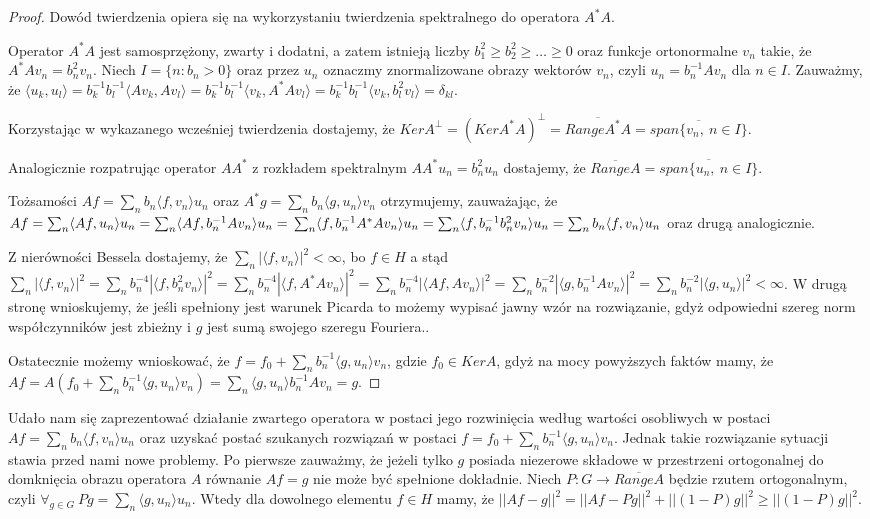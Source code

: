 \documentclass{article}
\begin{document}
\begin{proof}
Dowód twierdzenia opiera się na wykorzystaniu twierdzenia spektralnego do operatora $A^*A$.

Operator $A^*A$ jest samosprzężony, zwarty i dodatni, a zatem istnieją liczby $b_1^2\geq b_2^2\geq\dots\geq 0$ oraz funkcje ortonormalne $v_n$ takie, że $A^*Av_n=b_n^2v_n$. Niech $I=\{n\colon b_n>0\}$ oraz przez $u_n$ oznaczmy znormalizowane obrazy wektorów $v_n$, czyli $u_n=b_n^{-1}Av_n$ dla $n\in I$. Zauważmy, że $\langle u_k,u_l\rangle=b_k^{-1}b_l^{-1}\langle Av_k, Av_l\rangle=b_k^{-1}b_l^{-1}\langle v_k,A^*Av_l\rangle=b_k^{-1}b_l^{-1}\langle v_k,b_l^2v_l\rangle=\delta_{kl}$.

Korzystając w wykazanego wcześniej twierdzenia dostajemy, że $KerA^{\perp}=(KerA^*A)^{\perp}=\overline{RangeA^*A}=\overline{span\{v_n,\ n\in I\}}$.

Analogicznie rozpatrując operator $AA^*$ z rozkładem spektralnym $AA^*u_n=b_n^2u_n$ dostajemy, że $\overline{RangeA}=\overline{span\{u_n,\ n\in I\}}$.

Tożsamości $Af=\sum_nb_n\langle f, v_n\rangle u_n$ oraz $A^*g=\sum_nb_n\langle g, u_n\rangle v_n$ otrzymujemy, zauważając, że
$Af=\sum_n\langle Af,u_n\rangle u_n=\sum_n\langle Af, b_n^{-1}Av_n\rangle u_n=\\ \sum_n\langle f,b_n^{-1}A^*Av_n\rangle u_n=\sum_n\langle f,b_n^{-1}b_n^2v_n\rangle u_n=\sum_n b_n\langle f,v_n\rangle u_n$ oraz drugą analogicznie.

Z nierówności Bessela dostajemy, że $\sum_n|\langle f, v_n\rangle |^2<\infty$, bo $f\in H$ a stąd
$\sum_n|\langle f,v_n\rangle|^2=\sum_nb_n^{-4}|\langle f,b_n^2v_n\rangle|^2=\sum_nb_n^{-4}|\langle f, A^*Av_n\rangle|^2=\sum_nb_n^{-4}|\langle Af,Av_n\rangle|^2=\sum_nb_n^{-2}|\langle g, b_n^{-1}Av_n\rangle|^2=\sum_nb_n^{-2}|\langle g, u_n\rangle|^2<\infty$. W drugą stronę wnioskujemy, że jeśli spełniony jest warunek Picarda to możemy wypisać jawny wzór na rozwiązanie,  gdyż odpowiedni szereg norm współczynników jest zbieżny i $g$ jest sumą swojego szeregu Fouriera..

Ostatecznie możemy wnioskować, że $f=f_0+\sum_nb_n^{-1}\langle g, u_n\rangle v_n$, gdzie $f_0\in KerA$, gdyż na mocy powyższych faktów mamy, że $Af=A(f_0+\sum_nb_n^{-1}\langle g, u_n\rangle v_n)=\sum_n\langle g, u_n\rangle b_n^{-1}Av_n=g$.
\end{proof}

Udało nam się zaprezentować działanie zwartego operatora w postaci jego rozwinięcia według wartości osobliwych w postaci $Af=\sum_nb_n\langle f, v_n\rangle u_n$ oraz uzyskać postać szukanych rozwiązań w postaci $f=f_0+\sum_nb_n^{-1}\langle g, u_n\rangle v_n$. Jednak takie rozwiązanie sytuacji stawia przed nami nowe problemy. Po pierwsze zauważmy, że jeżeli tylko $g$ posiada niezerowe składowe w przestrzeni ortogonalnej do domknięcia obrazu operatora $A$ równanie $Af=g$ nie może być spełnione dokładnie. Niech $P\colon G\to \overline{RangeA}$ będzie rzutem ortogonalnym, czyli $\forall_{g\in G}\ Pg=\sum_n\langle g,u_n\rangle u_n$. Wtedy dla dowolnego elementu $f\in H$ mamy, że $||Af-g||^2=||Af-Pg||^2+||(1-P)g||^2\geq ||(1-P)g||^2$.
\end{document}
